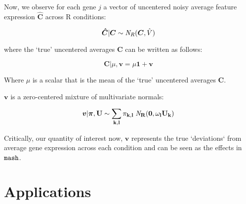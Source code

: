 \documentclass[11pt, oneside]{article}   	%
\newcommand{\ceff}{\bm{C}}
\newcommand{\chat}{\bm{\hat{C}}}
\newcommand{\vb}{\bm{v}}
\def\mash{{\tt mash }}
\begin{document}
Now, we observe for each gene $j$ a vector of uncentered noisy average feature expression $\chat$ across R conditions:

\begin{equation}
  \label{nobaselike}
\chat | \bm{\ceff} \sim {\it N}_R(\bm{\ceff}, \hat{V})
\end{equation}

where the `true' uncentered averages $\ceff$ can be written as follows:

\begin{equation}
  \label{uncenteredprior}
\ceff | \mu, \vb  = \mu \bm{1} + \vb
\end{equation}

Where $\mu$ is a scalar that is the mean of the `true' uncentered averages $\ceff$.

$\vb$ is a zero-centered mixture of multivariate normals:


 \begin{equation}
  \label{prior_v_mix}
  \vb | \bm{\pi},\bf{U} \sim \sum_{k,l} \pi_{k,l} \;{\it N}_R(\bm{0}, \omega_l U_{k})
\end{equation}

Critically, our quantity of interest now, $\vb$  represents the true `deviations` from average gene expression across each condition and can be seen as the effects in $\mash$.





\section{Applications}
\end{document}
